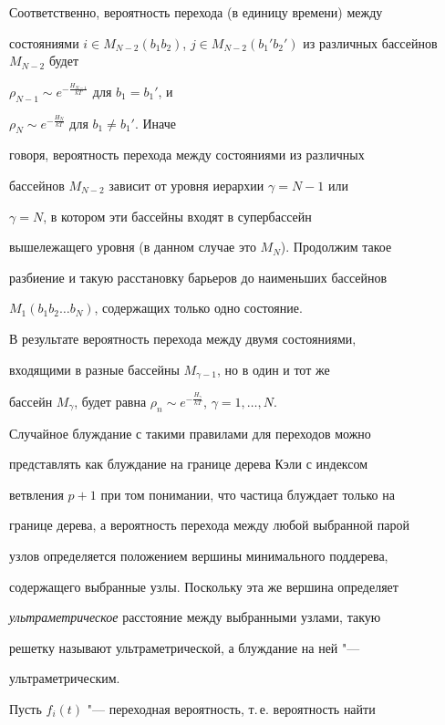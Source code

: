 Соответственно, вероятность перехода (в единицу времени) между

состояниями $i\in M_{N-2}(b_{1}b_{2})$, $j\in

M_{N-2}(b_{1}'b_{2}')$ из различных бассейнов $M_{N-2}$ будет

$\rho_{N-1}\sim e^{-\frac{H_{N-1}}{kT}}$ для $b_{1}=b_{1}'$, и

$\rho_{N}\sim e^{-\frac{H_{N}}{kT}}$ для $b_{1}\ne b_{1}'$. Иначе

говоря, вероятность перехода между состояниями из различных

бассейнов $M_{N-2}$ зависит от уровня иерархии $\gamma=N-1$ или

$\gamma=N$, в котором эти бассейны входят в супербассейн

вышележащего уровня (в данном случае это $M_{N}$). Продолжим такое

разбиение и такую расстановку  барьеров до наименьших бассейнов

$M_{1}(b_{1}b_{2}\ldots b_{N})$, содержащих только одно состояние.

В результате вероятность перехода между двумя состояниями,

входящими в разные бассейны $M_{\gamma-1}$, но в один и тот же

бассейн $M_{\gamma}$, будет равна $\rho_{n}\sim

e^{-\frac{H_{\gamma}}{kT}}$, $\gamma=1,\ldots,N$.



Случайное блуждание с такими правилами для переходов можно

представлять как блуждание на границе дерева Кэли с индексом

ветвления ${p+1}$ при том понимании, что частица блуждает только на

границе дерева, а вероятность перехода между любой выбранной парой

узлов определяется положением вершины минимального поддерева,

содержащего выбранные узлы. Поскольку эта же вершина определяет

{\sl ультраметрическое} расстояние между выбранными узлами, такую

решетку называют ультраметрической, а блуждание на ней "---

ультраметрическим.



Пусть $f_{i}(t)$ "--- переходная вероятность, т.\,е.  вероятность найти

